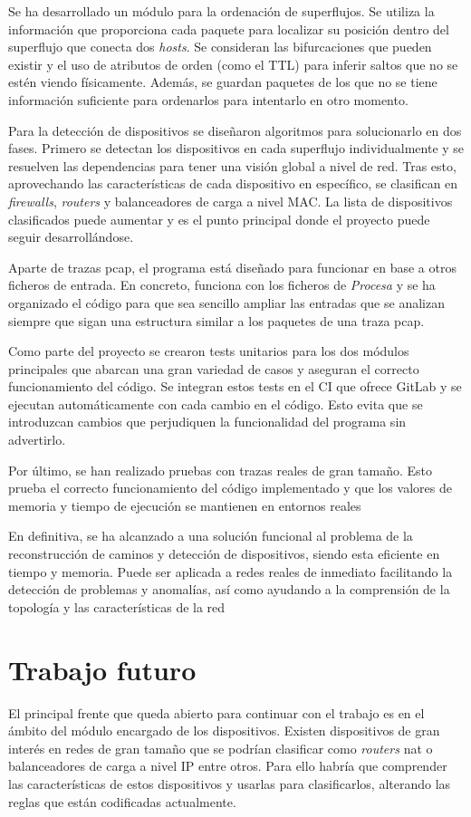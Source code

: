\documentclass[tfg,epsbased,lof,lot,loa,covers,final,copyright,overleaf]{tfgtfmthesisuam}
\begin{document}
Se ha desarrollado un módulo para la ordenación de superflujos. Se utiliza la información que proporciona cada paquete para localizar su posición dentro del superflujo que conecta dos \textit{hosts}. Se consideran las bifurcaciones que pueden existir y el uso de atributos de orden (como el TTL) para inferir saltos que no se estén viendo físicamente. Además, se guardan paquetes de los que no se tiene información suficiente para ordenarlos para intentarlo en otro momento.

Para la detección de dispositivos se diseñaron algoritmos para solucionarlo en dos fases. Primero se detectan los dispositivos en cada superflujo individualmente y se resuelven las dependencias para tener una visión global a nivel de red. Tras esto, aprovechando las características de cada dispositivo en específico, se clasifican en \textit{firewalls}, \textit{routers} y balanceadores de carga a nivel MAC. La lista de dispositivos clasificados puede aumentar y es el punto principal donde el proyecto puede seguir desarrollándose.

Aparte de trazas pcap, el programa está diseñado para funcionar en base a otros ficheros de entrada. En concreto, funciona con los ficheros de \textit{Procesa} y se ha organizado el código para que sea sencillo ampliar las entradas que se analizan siempre que sigan una estructura similar a los paquetes de una traza pcap.

Como parte del proyecto se crearon tests unitarios para los dos módulos principales que abarcan una gran variedad de casos y aseguran el correcto funcionamiento del código. Se integran estos tests en el CI que ofrece GitLab y se ejecutan automáticamente con cada cambio en el código. Esto evita que se introduzcan cambios que perjudiquen la funcionalidad del programa sin advertirlo.

Por último, se han realizado pruebas con trazas reales de gran tamaño. Esto prueba el correcto funcionamiento del código implementado y que los valores de memoria y tiempo de ejecución se mantienen en entornos reales

En definitiva, se ha alcanzado a una solución funcional al problema de la reconstrucción de caminos y detección de dispositivos, siendo esta eficiente en tiempo y memoria. Puede ser aplicada a redes reales de inmediato facilitando la detección de problemas y anomalías, así como ayudando a la comprensión de la topología y las características de la red

\section{Trabajo futuro}
El principal frente que queda abierto para continuar con el trabajo es en el ámbito del módulo encargado de los dispositivos. Existen dispositivos de gran interés en redes de gran tamaño que se podrían clasificar como \textit{routers} \gls{nat} o balanceadores de carga a nivel IP entre otros. Para ello habría que comprender las características de estos dispositivos y usarlas para clasificarlos, alterando las reglas que están codificadas actualmente.
\end{document}
